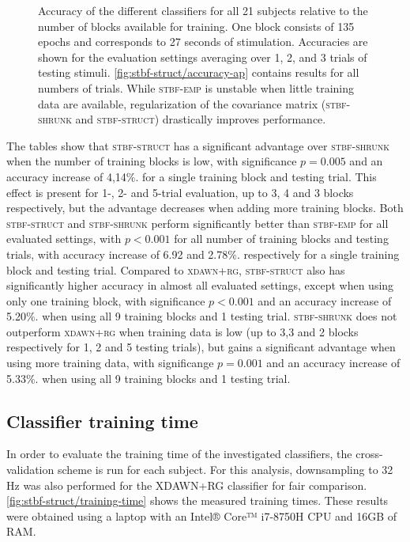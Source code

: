   \begin{figure}
    \sffamily
    \sansmath
    
    \caption[Clasifier accuracy in function of available training data.]{%
      Accuracy of the different classifiers for all 21 subjects relative to the
			number of blocks available for training. One block consists of 135
			epochs and corresponds to 27 seconds of stimulation. Accuracies
			are shown for the evaluation settings averaging over 1, 2, and
			3 trials of testing stimuli.
			\cref{fig:stbf-struct/accuracy-ap} contains results for all numbers of trials.
			While \textsc{stbf-emp} is unstable when little training data
			are available,
			regularization of the covariance matrix (\textsc{stbf-shrunk} and
			\textsc{stbf-struct}) drastically improves performance.}
		\label{fig:accuracy}
	\end{figure}

	The tables show that \textsc{stbf-struct} has a significant advantage over
  \textsc{stbf-shrunk} when the number of training blocks is low, with
  significance $p=0.005$ and  an accuracy increase of 4,14$\%.$ for a single training block
  and testing trial.
  This effect is present for 1-, 2- and 5-trial evaluation, up to 3, 4 and 3
  blocks respectively, but the advantage decreases when adding more training blocks.
	Both \textsc{stbf-struct} and \textsc{stbf-shrunk} perform significantly better
  than \textsc{stbf-emp} for all evaluated settings, with $p<0.001$ for all number
  of training blocks and testing trials, with accuracy
  increase of 6.92 and 2.78$\%.$ respectively for a single training block
  and testing trial.
	Compared to \textsc{xdawn+rg}, \textsc{stbf-struct} also has significantly
	higher accuracy in almost all evaluated settings, except when using only one
  training block, with significance $p<0.001$ and an accuracy increase of
  5.20$\%.$ when using all 9 training blocks and 1 testing trial.
	\textsc{stbf-shrunk} does not outperform \textsc{xdawn+rg} when training data
  is low (up to 3,3 and 2 blocks respectively for 1, 2 and 5 testing trials),
  but gains a significant advantage	when using more training data, with
  significange $p=0.001$ and an accuracy increase of 5.33$\%.$ when using all
  9 training blocks and 1 testing trial.

	\subsection{Classifier training time}
	In order to evaluate the training time of the investigated classifiers, the
	cross-validation scheme is run for each subject.
  For this analysis, downsampling to 32 Hz was also performed for the XDAWN+RG
  classifier for fair comparison.
  \cref{fig:stbf-struct/training-time} shows the measured training times.
	These results were obtained using a laptop with an Intel® Core™ i7-8750H CPU and 16GB of RAM.

